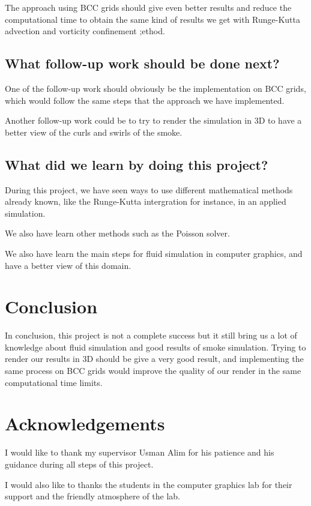 \documentclass[accepted,single]{gipaper}
\begin{document}
The approach using BCC grids should give even better results and reduce the computational time to obtain the same kind of results we get with Runge-Kutta advection and vorticity confinement ;ethod.

\subsection{What follow-up work should be done next?}

One of the follow-up work should obviously be the implementation on BCC grids, which would follow the same steps that the approach we have implemented.

Another follow-up work could be to try to render the simulation in 3D to have a better view of the curls and swirls of the smoke.

\subsection{What did we learn by doing this project? }

During this project, we have seen ways to use different mathematical methods already known, like the Runge-Kutta intergration for instance, in an applied simulation.

We also have learn other methods such as the Poisson solver.

We also have learn the main steps for fluid simulation in computer graphics, and have a better view of this domain.


\section{Conclusion}

In conclusion, this project is not a complete success but it still bring us a lot of knowledge about fluid simulation and good results of smoke simulation. Trying to render our results in 3D should be give a very good result, and implementing the same process on BCC grids would improve the quality of our render in the same computational time limits.


\section*{Acknowledgements}

I would like to thank my supervisor Usman Alim for his patience and his guidance during all steps of this project.

I would also like to thanks the students in the computer graphics lab for their support and the friendly atmosphere of the lab.




\end{document}
